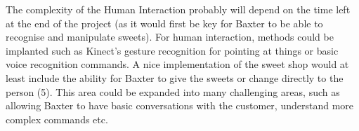 \newline\newline
The complexity of the Human Interaction probably will depend on the time left at the end of the project (as it would first be key for Baxter to be able to recognise and manipulate sweets). For human interaction, methods could be implanted such as Kinect's gesture recognition for pointing at things or basic voice recognition commands. A nice implementation of the sweet shop would at least include the ability for Baxter to give the sweets or change directly to the person (5). This area could be expanded into many challenging areas, such as allowing Baxter to have basic conversations with the customer, understand more complex commands etc.